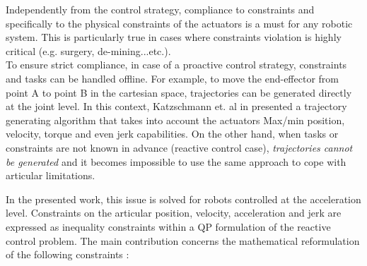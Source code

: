 \documentclass[a4paper, 10pt, conference]{ieeeconf}      %
\begin{document}
Independently from the control strategy, compliance to constraints and specifically to the physical constraints of the actuators is a must for any robotic system. This is particularly true in cases where constraints violation is highly critical (e.g. surgery, de-mining...etc.). 
\\
To ensure strict compliance, in case of a proactive control strategy, constraints and tasks can be handled offline. For example, to move the end-effector from point A to point B in the cartesian space, trajectories can be generated directly at the joint level. In this context, Katzschmann et. al in \cite{katzschmann2013towards} presented a trajectory generating algorithm that takes into account the actuators Max/min position, velocity, torque and even jerk capabilities. On the other hand, when tasks or constraints are not known in advance (reactive control case), \textit{trajectories cannot be generated} and it becomes impossible to use the same approach to cope with articular limitations. 


In the presented work, this issue is solved for robots controlled at the acceleration level. Constraints on the articular position, velocity, acceleration and jerk are expressed as inequality constraints within a QP formulation of the reactive control problem. The main contribution concerns the mathematical reformulation of the following constraints :

\end{document}
